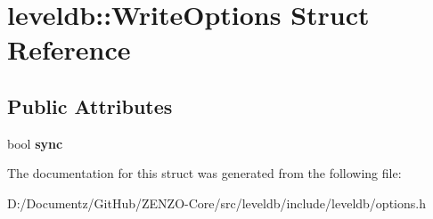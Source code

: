 \hypertarget{structleveldb_1_1_write_options}{}\section{leveldb\+::Write\+Options Struct Reference}
\label{structleveldb_1_1_write_options}
\subsection*{Public Attributes}
\begin{DoxyCompactItemize}
\item 
\mbox{\label{structleveldb_1_1_write_options_a07cd165ae5ed59a763001286e14ba47e}} 
bool {\bfseries sync}
\end{DoxyCompactItemize}


The documentation for this struct was generated from the following file\+:\begin{DoxyCompactItemize}
\item 
D\+:/\+Documentz/\+Git\+Hub/\+Z\+E\+N\+Z\+O-\/\+Core/src/leveldb/include/leveldb/options.\+h\end{DoxyCompactItemize}
